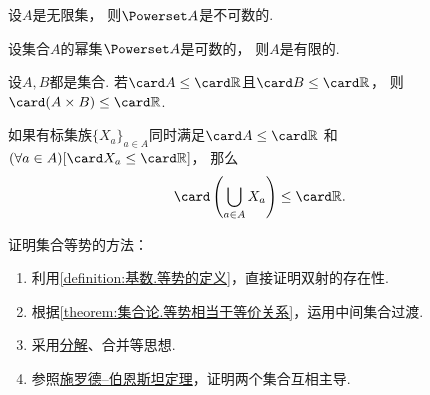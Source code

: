 \begin{proposition}
设\(A\)是无限集，
则\(\Powerset A\)是不可数的.
\end{proposition}
\begin{corollary}
设集合\(A\)的幂集\(\Powerset A\)是可数的，
则\(A\)是有限的.
\end{corollary}

\begin{proposition}
设\(A,B\)都是集合.
若\(\card A \leq \card\mathbb{R}\)且\(\card B \leq \card\mathbb{R}\)，
则\(\card(A \times B) \leq \card\mathbb{R}\).
\end{proposition}

\begin{proposition}
如果有标集族\(\{X_a\}_{a \in A}\)同时满足\(
	\card A \leq \card\mathbb{R}
\)
和\(
	(\forall a \in A)
	[\card X_a \leq \card\mathbb{R}]
\)，
那么\begin{equation*}
	\card\left( \bigcup_{a \in A} X_a \right) \leq \card\mathbb{R}.
\end{equation*}
\end{proposition}

证明集合等势的方法：\begin{enumerate}
	\item 利用\cref{definition:基数.等势的定义}，直接证明双射的存在性.
	\item 根据\cref{theorem:集合论.等势相当于等价关系}，运用中间集合过渡.
	\item 采用\hyperref[theorem:基数.集合在映射下的分解]{分解}、合并等思想.
	\item 参照\hyperref[theorem:集合论.施罗德--伯恩斯坦定理]{施罗德--伯恩斯坦定理}，证明两个集合互相主导.
\end{enumerate}
